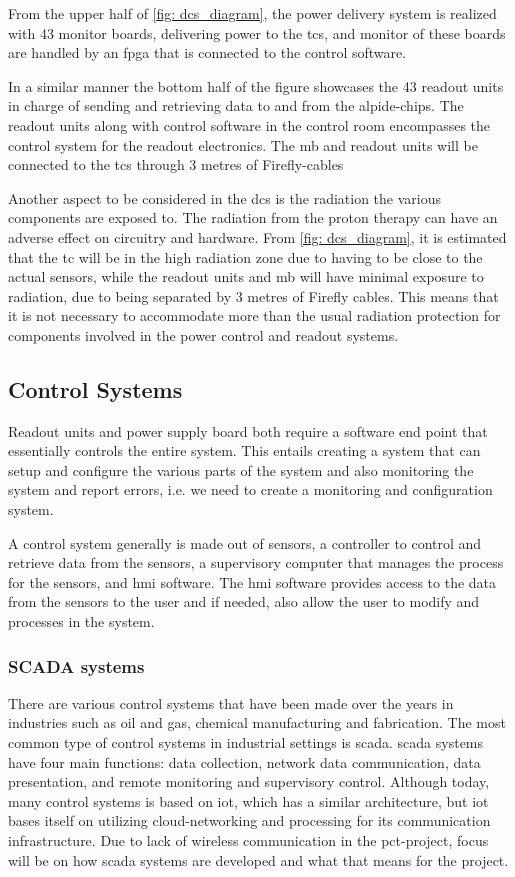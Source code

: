 \documentclass[main.tex]{subfiles}
\begin{document}
From the upper half of \autoref{fig: dcs_diagram}, the power delivery system is realized with 43 monitor boards, delivering power to the \gls{tc}s, and monitor of these boards are handled by an \gls{fpga} that is connected to the control software.

In a similar manner the bottom half of the figure showcases the 43 readout units in charge of sending and retrieving data to and from the \gls{alpide}-chips. The readout units along with control software in the control room encompasses the control system for the readout electronics. The \gls{mb} and readout units will be connected to the \gls{tc}s through 3 metres of Firefly-cables 

Another aspect to be considered in the \gls{dcs} is the radiation the various components are exposed to. The radiation from the proton therapy can have an adverse effect on circuitry and hardware. From \autoref{fig: dcs_diagram}, it is estimated that the \gls{tc} will be in the high radiation zone due to having to be close to the actual sensors, while the readout units and \gls{mb} will have minimal exposure to radiation, due to being separated by 3 metres of Firefly cables. This means that it is not necessary to accommodate more than the usual radiation protection for components involved in the power control and readout systems.


\subsection{Control Systems}

Readout units and power supply board both require a software end point that essentially controls the entire system. This entails creating a system that can setup and configure the various parts of the system and also monitoring the system and report errors, i.e. we need to create a monitoring and configuration system.

A control system generally is made out of sensors, a controller to control and retrieve data from the sensors, a supervisory computer that manages the process for the sensors, and \gls{hmi} software. The \gls{hmi} software provides access to the data from the sensors to the user and if needed, also allow the user to modify and processes in the system.


\subsubsection{SCADA systems}
There are various control systems that have been made over the years in industries such as oil and gas, chemical manufacturing and fabrication. The most common type of control systems in industrial settings is \gls{scada}. \gls{scada} systems have four main functions: data collection, network data communication, data presentation, and remote monitoring and supervisory control\cite{scada_intro}. Although today, many control systems is based on \gls{iot}, which has a similar architecture, but \gls{iot} bases itself on utilizing cloud-networking and processing for its communication infrastructure. Due to lack of wireless communication in the \gls{pct}-project, focus will be on how \gls{scada} systems are developed and what that means for the project.
\end{document}
